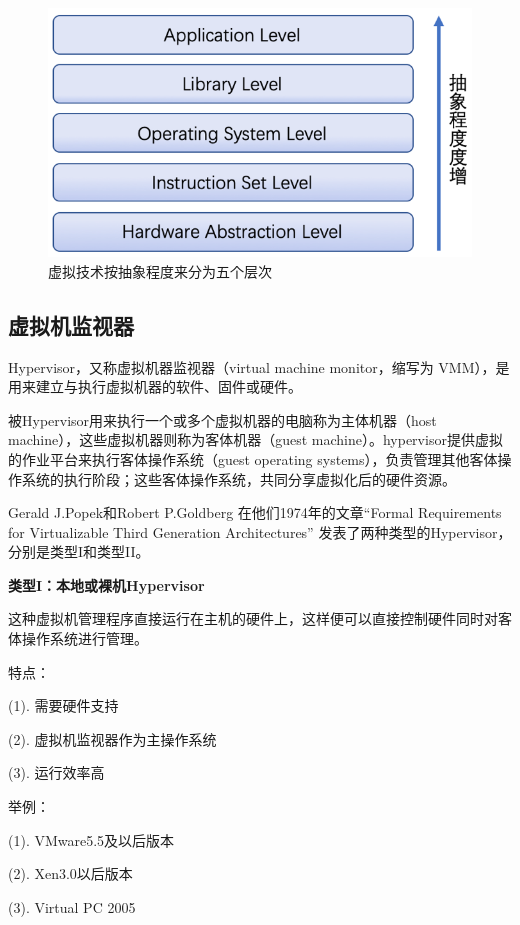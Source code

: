 \begin{figure}[htb]
  \centering
  \includegraphics{./Figure/IMG_Chap2_1.png}
  \caption{虚拟技术按抽象程度来分为五个层次}\label{Fig:chap2_1}
\end{figure}

\subsection{虚拟机监视器}
Hypervisor，又称虚拟机器监视器（virtual machine monitor，缩写为 VMM），是用来建立与执行虚拟机器的软件、固件或硬件。

被Hypervisor用来执行一个或多个虚拟机器的电脑称为主体机器（host machine），这些虚拟机器则称为客体机器（guest machine）。hypervisor提供虚拟的作业平台来执行客体操作系统（guest operating systems），负责管理其他客体操作系统的执行阶段；这些客体操作系统，共同分享虚拟化后的硬件资源。

Gerald J.Popek和Robert P.Goldberg 在他们1974年的文章“Formal Requirements for Virtualizable Third Generation Architectures” 发表了两种类型的Hypervisor，分别是类型I和类型II\cite{Kudinskas}。

\textbf{类型I：本地或裸机Hypervisor}

这种虚拟机管理程序直接运行在主机的硬件上，这样便可以直接控制硬件同时对客体操作系统进行管理。

特点：

    (1). 需要硬件支持

    (2). 虚拟机监视器作为主操作系统

    (3). 运行效率高

举例：

    (1). VMware5.5及以后版本

    (2). Xen3.0以后版本

    (3). Virtual PC 2005

